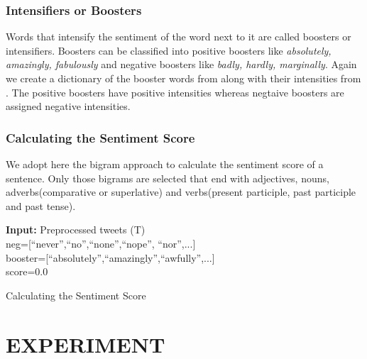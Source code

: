 \documentclass[a4paper, 10pt, conference]{ieeeconf}      %
\begin{document}
\subsubsection{Intensifiers or Boosters}
Words that intensify the sentiment of the word next to it are called boosters or intensifiers. Boosters can be classified into positive boosters like \textit{absolutely, amazingly, fabulously} and negative boosters like \textit{badly, hardly, marginally}. Again we create a dictionary of the booster words from \cite{c11} along with their intensities from \cite{c1}. The positive boosters have positive intensities whereas negtaive boosters are assigned negative intensities.
\subsubsection{Calculating the Sentiment Score}
We adopt here the bigram approach to calculate the sentiment score of a sentence. Only those bigrams are selected that end with adjectives, nouns, adverbs(comparative or superlative) and verbs(present participle, past participle and past tense).
\begin{algorithm}
	\SetAlgoLined
	\textbf{Input:} Preprocessed tweets (T)\\
	neg=[``never'',``no'',``none'',``nope'', ``nor'',...]\\
	booster=[``absolutely'',``amazingly'',``awfully'',...]\\
	score=0.0\;
	
		
\caption{Calculating the Sentiment Score}	
	\end{algorithm}


\section{EXPERIMENT}
\end{document}
